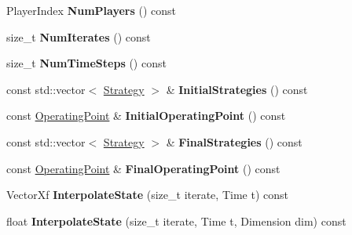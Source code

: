 \begin{DoxyCompactItemize}
\item 
Player\+Index {\bfseries Num\+Players} () const \hypertarget{classilqgames_1_1_solver_log_af2b335909e75f63a910f4f734890d4d7}{}\label{classilqgames_1_1_solver_log_af2b335909e75f63a910f4f734890d4d7}

\item 
size\+\_\+t {\bfseries Num\+Iterates} () const \hypertarget{classilqgames_1_1_solver_log_a205590ee3aadd88aaf11ef6b5bb774dc}{}\label{classilqgames_1_1_solver_log_a205590ee3aadd88aaf11ef6b5bb774dc}

\item 
size\+\_\+t {\bfseries Num\+Time\+Steps} () const \hypertarget{classilqgames_1_1_solver_log_a21898bab7582fcf5ca77fe336479b07b}{}\label{classilqgames_1_1_solver_log_a21898bab7582fcf5ca77fe336479b07b}

\item 
const std\+::vector$<$ \hyperlink{structilqgames_1_1_strategy}{Strategy} $>$ \& {\bfseries Initial\+Strategies} () const \hypertarget{classilqgames_1_1_solver_log_a2ac6ab2634e314d3eb7cc556850d7636}{}\label{classilqgames_1_1_solver_log_a2ac6ab2634e314d3eb7cc556850d7636}

\item 
const \hyperlink{structilqgames_1_1_operating_point}{Operating\+Point} \& {\bfseries Initial\+Operating\+Point} () const \hypertarget{classilqgames_1_1_solver_log_adf4581a26df80a6b69458f2d4f84deac}{}\label{classilqgames_1_1_solver_log_adf4581a26df80a6b69458f2d4f84deac}

\item 
const std\+::vector$<$ \hyperlink{structilqgames_1_1_strategy}{Strategy} $>$ \& {\bfseries Final\+Strategies} () const \hypertarget{classilqgames_1_1_solver_log_a3e998ebe01b5437dbea33c1e32739cbe}{}\label{classilqgames_1_1_solver_log_a3e998ebe01b5437dbea33c1e32739cbe}

\item 
const \hyperlink{structilqgames_1_1_operating_point}{Operating\+Point} \& {\bfseries Final\+Operating\+Point} () const \hypertarget{classilqgames_1_1_solver_log_ac02232ae7fa57715bc0b1795f4dd059f}{}\label{classilqgames_1_1_solver_log_ac02232ae7fa57715bc0b1795f4dd059f}

\item 
Vector\+Xf {\bfseries Interpolate\+State} (size\+\_\+t iterate, Time t) const \hypertarget{classilqgames_1_1_solver_log_a86b8dd605c03955a6fbafa2dc0b2a341}{}\label{classilqgames_1_1_solver_log_a86b8dd605c03955a6fbafa2dc0b2a341}

\item 
float {\bfseries Interpolate\+State} (size\+\_\+t iterate, Time t, Dimension dim) const \hypertarget{classilqgames_1_1_solver_log_ac81714a5caf9e2f497ed04b58e333757}{}\label{classilqgames_1_1_solver_log_ac81714a5caf9e2f497ed04b58e333757}


\end{DoxyCompactItemize}
